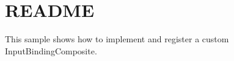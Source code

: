 \chapter{README}
\hypertarget{md__hey_tea_9_2_library_2_package_cache_2com_8unity_8inputsystem_0d1_86_83_2_samples_0i_2_custom_composite_2_r_e_a_d_m_e}{}\label{md__hey_tea_9_2_library_2_package_cache_2com_8unity_8inputsystem_0d1_86_83_2_samples_0i_2_custom_composite_2_r_e_a_d_m_e}
This sample shows how to implement and register a custom Input\+Binding\+Composite. 
